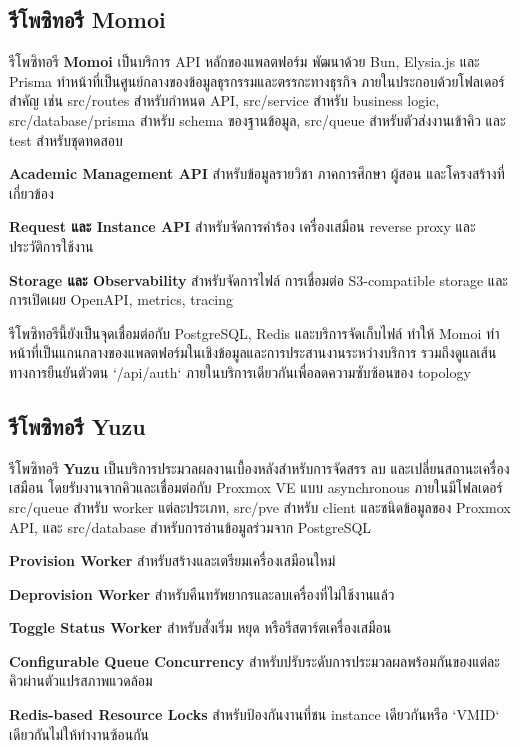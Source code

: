 \subsection{รีโพซิทอรี Momoi}
\hspace*{1.3em}
รีโพซิทอรี \textbf{Momoi} เป็นบริการ API หลักของแพลตฟอร์ม พัฒนาด้วย Bun, Elysia.js และ Prisma ทำหน้าที่เป็นศูนย์กลางของข้อมูลธุรกรรมและตรรกะทางธุรกิจ ภายในประกอบด้วยโฟลเดอร์สำคัญ เช่น src/routes สำหรับกำหนด API, src/service สำหรับ business logic, src/database/prisma สำหรับ schema ของฐานข้อมูล, src/queue สำหรับตัวส่งงานเข้าคิว และ test สำหรับชุดทดสอบ
\begin{mycustomenum2}
    \item \textbf{Academic Management API} สำหรับข้อมูลรายวิชา ภาคการศึกษา ผู้สอน และโครงสร้างที่เกี่ยวข้อง
    \item \textbf{Request และ Instance API} สำหรับจัดการคำร้อง เครื่องเสมือน reverse proxy และประวัติการใช้งาน
    \item \textbf{Storage และ Observability} สำหรับจัดการไฟล์ การเชื่อมต่อ S3-compatible storage และการเปิดเผย OpenAPI, metrics, tracing
\end{mycustomenum2}
\hspace*{1.3em}
รีโพซิทอรีนี้ยังเป็นจุดเชื่อมต่อกับ PostgreSQL, Redis และบริการจัดเก็บไฟล์ ทำให้ Momoi ทำหน้าที่เป็นแกนกลางของแพลตฟอร์มในเชิงข้อมูลและการประสานงานระหว่างบริการ รวมถึงดูแลเส้นทางการยืนยันตัวตน `/api/auth` ภายในบริการเดียวกันเพื่อลดความซับซ้อนของ topology

\subsection{รีโพซิทอรี Yuzu}
\hspace*{1.3em}
รีโพซิทอรี \textbf{Yuzu} เป็นบริการประมวลผลงานเบื้องหลังสำหรับการจัดสรร ลบ และเปลี่ยนสถานะเครื่องเสมือน โดยรับงานจากคิวและเชื่อมต่อกับ Proxmox VE แบบ asynchronous ภายในมีโฟลเดอร์ src/queue สำหรับ worker แต่ละประเภท, src/pve สำหรับ client และชนิดข้อมูลของ Proxmox API, และ src/database สำหรับการอ่านข้อมูลร่วมจาก PostgreSQL

\begin{mycustomenum2}
    \item \textbf{Provision Worker} สำหรับสร้างและเตรียมเครื่องเสมือนใหม่
    \item \textbf{Deprovision Worker} สำหรับคืนทรัพยากรและลบเครื่องที่ไม่ใช้งานแล้ว
    \item \textbf{Toggle Status Worker} สำหรับสั่งเริ่ม หยุด หรือรีสตาร์ตเครื่องเสมือน
    \item \textbf{Configurable Queue Concurrency} สำหรับปรับระดับการประมวลผลพร้อมกันของแต่ละคิวผ่านตัวแปรสภาพแวดล้อม
    \item \textbf{Redis-based Resource Locks} สำหรับป้องกันงานที่ชน instance เดียวกันหรือ `VMID` เดียวกันไม่ให้ทำงานซ้อนกัน
\end{mycustomenum2}

